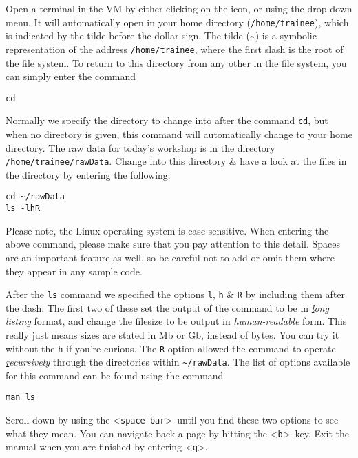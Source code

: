 \begin{steps}
Open a terminal in the VM by either clicking on the icon, or using the drop-down menu.
It will automatically open in your home directory (\texttt{/home/trainee}), which is indicated by the tilde before the dollar sign.
The tilde (\~{}) is a symbolic representation of the address \texttt{/home/trainee}, where the first slash is the root of the file system.
To return to this directory from any other in the file system, you can simply enter the command
\begin{lstlisting}
cd 
\end{lstlisting}

Normally we specify the directory to change into after the command \texttt{cd}, but when no directory is given, this command will automatically change to your home directory.
The raw data for today's workshop is in the directory \texttt{/home/trainee/rawData}.
Change into this directory \& have a look at the files in the directory by entering the following.
\begin{lstlisting}
cd ~/rawData
ls -lhR
\end{lstlisting}
\end{steps}

\begin{warning}
Please note, the Linux operating system is case-sensitive.
When entering the above command, please make sure that you pay attention to this detail.
Spaces are an important feature as well, so be careful not to add or omit them where they appear in any sample code.
\end{warning}

After the \texttt{ls} command we specified the options \texttt{l}, \texttt{h} \& \texttt{R} by including them after the dash.
The first two of these set the output of the command to be in \textit{\underline{l}ong listing} format, and change the filesize to be output in \textit{\underline{h}uman-readable} form.
This really just means sizes are stated in Mb or Gb, instead of bytes.
You can try it without the \texttt{h} if you're curious.
The \texttt{R} option allowed the command to operate \textit{\underline{r}ecursively} through the directories within \texttt{\~{}/rawData}.
The list of options available for this command can be found using the command
\begin{lstlisting}
man ls
\end{lstlisting}
Scroll down by using the \textless \texttt{space bar}\textgreater \ until you find these two options to see what they mean.
You can navigate back a page by hitting the \textless \texttt{b}\textgreater \ key.
Exit the manual when you are finished by entering \textless \texttt{q}\textgreater.